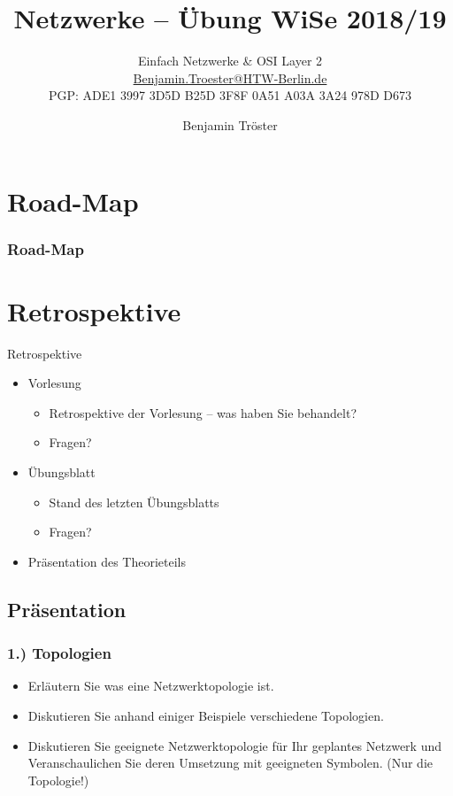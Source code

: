 \documentclass[xcolor=dvipsnames, aspectratio=169]{beamer}
\begin{document}

\title{Netzwerke -- Übung WiSe 2018/19}
\subtitle{Einfach Netzwerke \& OSI Layer 2\\
		\href{mailto:Benjamin.Troester@HTW-Berlin.de}{Benjamin.Troester@HTW-Berlin.de}\\
		PGP: ADE1 3997 3D5D B25D 3F8F 0A51 A03A 3A24 978D D673 }
\author{Benjamin Tröster}

\date{}

\begin{frame}
\titlepage

\end{frame}

\section*{Road-Map}
\begin{frame}
\frametitle{Road-Map}
\begin{multicols}{2}
  \tableofcontents
\end{multicols}
\end{frame}

\section{Retrospektive}
\begin{frame}{Retrospektive}
\begin{itemize}
	\item Vorlesung
	\begin{itemize}
		\item Retrospektive der Vorlesung -- was haben Sie behandelt?
		\item Fragen?
	\end{itemize}
	\item Übungsblatt
	\begin{itemize}
		\item Stand des letzten Übungsblatts
		\item Fragen?
	\end{itemize}
	\item Präsentation des Theorieteils
\end{itemize}
\end{frame}


\subsection{Präsentation}
\begin{frame}
\frametitle{1.) Topologien}
	\begin{itemize}
		\item Erläutern Sie was eine Netzwerktopologie ist.
		\item Diskutieren Sie anhand einiger Beispiele verschiedene Topologien.
		\item Diskutieren Sie geeignete Netzwerktopologie für Ihr geplantes Netzwerk und Veranschaulichen Sie deren Umsetzung mit geeigneten Symbolen. (Nur die Topologie!)
	\end{itemize}
\end{frame}
\end{document}
